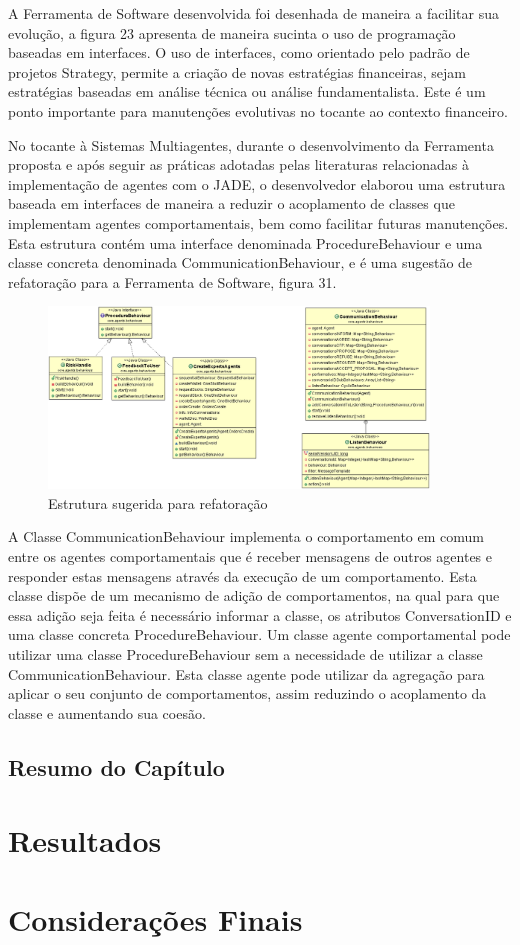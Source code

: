 A Ferramenta de Software desenvolvida foi desenhada de maneira a facilitar sua evolução, a figura 23 apresenta de maneira sucinta o uso de programação baseadas em interfaces. O uso de interfaces, como orientado pelo padrão de projetos Strategy, permite a criação de novas estratégias financeiras, sejam estratégias baseadas em análise técnica ou análise fundamentalista. Este é um ponto importante para manutenções evolutivas no tocante ao contexto financeiro.

No tocante à Sistemas Multiagentes, durante o desenvolvimento da Ferramenta proposta e após seguir as práticas adotadas pelas literaturas relacionadas à implementação de agentes com o JADE, o desenvolvedor elaborou uma estrutura baseada em interfaces de maneira a reduzir o acoplamento de classes que implementam agentes comportamentais, bem como facilitar futuras manutenções. Esta estrutura contém uma interface denominada ProcedureBehaviour e uma classe concreta denominada CommunicationBehaviour, e é uma sugestão de refatoração para a Ferramenta de Software, figura 31.

\begin{figure}[h]
\centering
\label{f25}
\includegraphics[width=0.9\textwidth]{figuras/pacoteBehaviours}
\caption{Estrutura sugerida para refatoração}
\end{figure}
\FloatBarrier

A Classe CommunicationBehaviour implementa o comportamento em comum entre os agentes comportamentais que é receber mensagens de outros agentes e responder estas mensagens através da execução de um comportamento. Esta classe dispõe de um mecanismo de adição de comportamentos, na qual para que essa adição seja feita é necessário informar a classe, os atributos ConversationID e uma classe concreta ProcedureBehaviour. Um classe agente comportamental pode utilizar uma classe ProcedureBehaviour sem a necessidade de utilizar a classe CommunicationBehaviour. Esta classe agente pode utilizar da agregação para aplicar o seu conjunto de comportamentos, assim reduzindo o acoplamento da classe e aumentando sua coesão.
\section{Resumo do Capítulo}
\newpage
\chapter[RESULTADOS]{Resultados}


\newpage
\chapter[CONSIDERAÇÕES FINAIS]{Considerações Finais}

